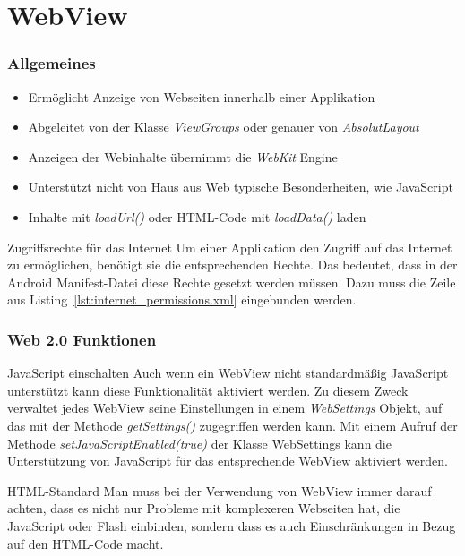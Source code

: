 \section{WebView}
\begin{frame}[label=webview]
   \frametitle{Allgemeines}
   \begin{itemize}
      \item Ermöglicht Anzeige von Webseiten innerhalb einer Applikation
      \item Abgeleitet von der Klasse \emph{ViewGroups} oder genauer von \emph{AbsolutLayout}
      \item Anzeigen der Webinhalte übernimmt die \emph{WebKit} Engine
      \item Unterstützt nicht von Haus aus Web typische Besonderheiten, wie JavaScript
      \item Inhalte mit \emph{loadUrl()} oder HTML-Code mit \emph{loadData()} laden
   \end{itemize}

   \begin{alertblock}{Zugriffsrechte für das Internet}
      Um einer Applikation den Zugriff auf das Internet zu ermöglichen, benötigt sie 
      die entsprechenden Rechte. Das bedeutet, dass in der Android Manifest-Datei 
      diese Rechte gesetzt werden müssen. Dazu muss die Zeile aus 
      Listing~\ref{lst:internet_permissions.xml} eingebunden werden.

      \vspace{3mm}

       
   \end{alertblock}
\end{frame}

\begin{frame}
   \frametitle{Web 2.0 Funktionen}
   \begin{alertblock}{JavaScript einschalten}
      Auch wenn ein WebView nicht standardmäßig JavaScript unterstützt kann diese 
      Funktionalität aktiviert werden. Zu diesem Zweck verwaltet jedes WebView 
      seine Einstellungen in einem \emph{WebSettings} Objekt, auf das mit der 
      Methode \emph{getSettings()} zugegriffen werden kann. Mit einem Aufruf 
      der Methode \emph{setJavaScriptEnabled(true)} der Klasse WebSettings 
      kann die Unterstützung von JavaScript für das entsprechende WebView aktiviert werden.
   \end{alertblock}

   \begin{alertblock}{HTML-Standard}
      Man muss bei der Verwendung von WebView immer darauf achten, dass es nicht 
      nur Probleme mit komplexeren Webseiten hat, die JavaScript oder Flash einbinden, 
      sondern dass es auch Einschränkungen in Bezug auf den HTML-Code macht.
   \end{alertblock}
\end{frame}

